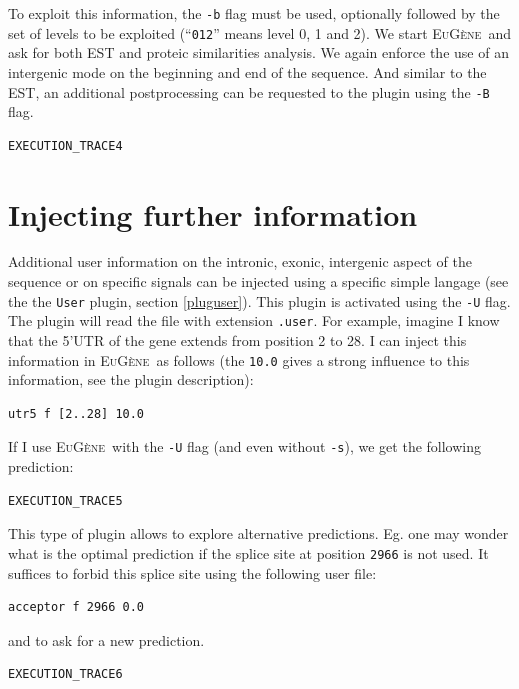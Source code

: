 \documentclass[a4paper,titlepage]{report}
\newcommand{\EuGene}{\textsc{EuG\`ene}}
\begin{document}
To exploit this information, the \texttt{-b} flag must be used,
optionally followed by the set of levels to be exploited
(``\texttt{012}'' means level 0, 1 and 2).  We start \EuGene\ and ask
for both EST and proteic similarities analysis. We again enforce the
use of an intergenic mode on the beginning and end of the sequence.
And similar to the EST, an additional postprocessing can be requested
to the plugin using the \texttt{-B} flag.

\begin{Verbatim}[fontsize=\scriptsize]
EXECUTION_TRACE4
\end{Verbatim}

\section{Injecting further information}

Additional user information on the intronic, exonic, intergenic aspect
of the sequence or on specific signals can be injected using a
specific simple langage (see the the \texttt{User} plugin,
section \ref{pluguser}). This plugin is activated using the
\texttt{-U} flag. The plugin will read the file with extension
\texttt{.user}. For example, imagine I know that the 5'UTR of the gene
extends from position 2 to 28. I can inject this information in
\EuGene\ as follows (the \texttt{10.0} gives a strong influence to
this information, see the plugin description):

\begin{Verbatim}[fontsize=\scriptsize]
utr5 f [2..28] 10.0
\end{Verbatim} 

If I use \EuGene\ with the \texttt{-U} flag (and even without
\texttt{-s}), we get the following prediction:

\begin{Verbatim}[fontsize=\scriptsize]
EXECUTION_TRACE5
\end{Verbatim} 

This type of plugin allows to explore alternative predictions. Eg. one
may wonder what is the optimal prediction if the splice site at
position \texttt{2966} is not used. It suffices to forbid this splice
site using the following user file:

\begin{Verbatim}[fontsize=\scriptsize]
acceptor f 2966 0.0
\end{Verbatim}
and to ask for a new prediction.

\begin{Verbatim}[fontsize=\scriptsize]
EXECUTION_TRACE6
\end{Verbatim}
\end{document}

